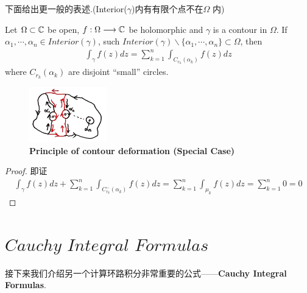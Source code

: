 \vspace{2em}
下面给出更一般的表述.(Interior($\gamma$)内有有限个点不在$\Omega$ 内)
\begin{corollary}\label{cor 5.1.3}
	Let $\Omega \subset \mathbb{C}$ be open, $f : \Omega \longrightarrow \mathbb{C}$ be holomorphic and $\gamma$ is a contour in $\Omega$. If $\alpha_1 , \cdots , \alpha_n \in Interior(\gamma)$, such $Interior(\gamma) \backslash \{ \alpha_1 , \cdots , \alpha_n \} \subset \Omega$, then
	\begin{align}
		\int_{\gamma}{f(z) dz} = \sum_{k = 1}^{n}{\int_{C_{r_k}(\alpha_k)}{f(z) dz}} 
	\end{align}
	where $C_{r_k}(\alpha_k)$ are disjoint “small” circles.
	
	\begin{figure}[htbp]  %
		\centering  %
		\includegraphics[width=0.3\textwidth]{figure/5.1-2} %
		\caption{\textbf{Principle of contour deformation (Special Case)}} %
		\label{pic 5.1-2}
	\end{figure}
	
	\begin{proof}
		即证
		\begin{align}
			\int_{\gamma}{f(z) dz} + \sum_{k = 1}^{n}{\int_{C_{r_k}^{-}(\alpha_k)}{f(z) dz}} = \sum_{k = 1}^{n}{\int_{\mu_{k}}{f(z) dz}} = \sum_{k = 1}^{n}{0} = 0
		\end{align}
	\end{proof}
\end{corollary}

\newpage
\section{$Cauchy \,\, Integral \,\, Formulas$}
\begin{center}
	接下来我们介绍另一个计算环路积分非常重要的公式——\textbf{Cauchy Integral Formulas}.
\end{center}

